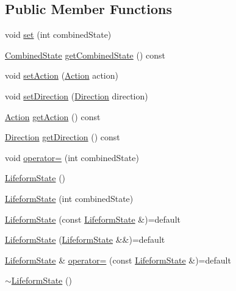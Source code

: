 \subsection*{Public Member Functions}
\begin{DoxyCompactItemize}
\item 
void \hyperlink{classZeta_1_1LifeformState_adcf9a8412c09be44bced238d79cba407}{set} (int combined\+State)
\item 
\hyperlink{classZeta_1_1LifeformState_a877fbe4e8efefd0a5323f950909181b6}{Combined\+State} \hyperlink{classZeta_1_1LifeformState_a95038676dc5242b76ab976c0fb8455e6}{get\+Combined\+State} () const 
\item 
void \hyperlink{classZeta_1_1LifeformState_ab43573f2b2577534a0e62114b5eb1c53}{set\+Action} (\hyperlink{classZeta_1_1LifeformState_a965add1b0f9a548c9f3f9147b34b4816}{Action} action)
\item 
void \hyperlink{classZeta_1_1LifeformState_aeb54cf32de83f687d291bc3c19259f28}{set\+Direction} (\hyperlink{classZeta_1_1LifeformState_a63f770b2fa2c1d9b86b59108888d2806}{Direction} direction)
\item 
\hyperlink{classZeta_1_1LifeformState_a965add1b0f9a548c9f3f9147b34b4816}{Action} \hyperlink{classZeta_1_1LifeformState_a513bee67924829cce8715f68df29a413}{get\+Action} () const 
\item 
\hyperlink{classZeta_1_1LifeformState_a63f770b2fa2c1d9b86b59108888d2806}{Direction} \hyperlink{classZeta_1_1LifeformState_a2fd48dd5ca23ef0b381aa44574fb64c3}{get\+Direction} () const 
\item 
void \hyperlink{classZeta_1_1LifeformState_afdda73f560b7c74750e80a55c002e9df}{operator=} (int combined\+State)
\item 
\hyperlink{classZeta_1_1LifeformState_accac9f491141ee845e142142ae423d2c}{Lifeform\+State} ()
\item 
\hyperlink{classZeta_1_1LifeformState_a99f4f177a56da799393c6d7d0fe072d3}{Lifeform\+State} (int combined\+State)
\item 
\hyperlink{classZeta_1_1LifeformState_adee7dc3255716a6623c32072f80a98b7}{Lifeform\+State} (const \hyperlink{classZeta_1_1LifeformState}{Lifeform\+State} \&)=default
\item 
\hyperlink{classZeta_1_1LifeformState_a129c1cbe089d1ddb8fc0eee876b8526f}{Lifeform\+State} (\hyperlink{classZeta_1_1LifeformState}{Lifeform\+State} \&\&)=default
\item 
\hyperlink{classZeta_1_1LifeformState}{Lifeform\+State} \& \hyperlink{classZeta_1_1LifeformState_ac4d8d23ce382bf1a46004f38b4be003c}{operator=} (const \hyperlink{classZeta_1_1LifeformState}{Lifeform\+State} \&)=default
\item 
\hyperlink{classZeta_1_1LifeformState_a4d71acd0fb41d88f38c7bdccbef06038}{$\sim$\+Lifeform\+State} ()
\end{DoxyCompactItemize}
